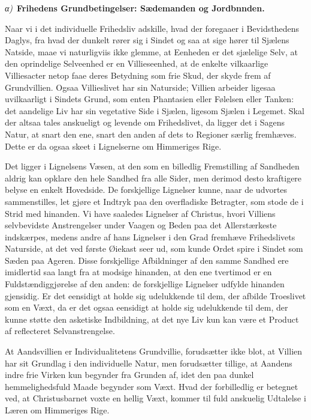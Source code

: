 \documentclass[12pt]{book}
\newcommand{\greekrun}[2]{%
  \medskip\begin{center}{\itshape #1)}\ {\bfseries #2}\end{center}\medskip}
\begin{document}
\greekrun{α}{Frihedens Grundbetingelser: Sædemanden og Jordbnnden.}

Naar vi i det individuelle Frihedsliv adskille, hvad der foregaaer i
Bevidsthedens Daglys, fra hvad der dunkelt rører sig i Sindet og saa
at sige hører til Sjælens Natside, maae vi naturligviis ikke glemme,
at Eenheden er det sjælelige Selv, at den oprindelige Selveenhed er
en Villieseenhed, at de enkelte vilkaarlige Villiesacter netop faae
deres Betydning som frie Skud, der skyde frem af Grundvillien.
Ogsaa Villieslivet har sin Naturside; Villien arbeider ligesaa
uvilkaarligt i Sindets Grund, som enten Phantasien eller Følelsen
eller Tanken: det aandelige Liv har sin vegetative Side i Sjælen,
ligesom Sjælen i Legemet. Skal der altsaa tales anskueligt og
levende om Frihedslivet, da ligger det i Sagens Natur, at snart den
ene, snart den anden af dets to Regioner særlig fremhæves. Dette er
da ogsaa skeet i Lignelserne om Himmeriges Rige.

Det ligger i Lignelsens Væsen, at den som en billedlig Fremstilling
af Sandheden aldrig kan opklare den hele Sandhed fra alle Sider, men
derimod desto kraftigere belyse en enkelt Hovedside. De forskjellige
Lignelser kunne, naar de udvortes sammenstilles, let gjøre et
Indtryk paa den overfladiske Betragter, som stode de i Strid med
hinanden. Vi have saaledes Lignelser af Christus,
hvori Villiens selvbevidste Anstrengelser under Vaagen og Beden paa
det Allerstærkeste indskærpes, medens andre af hans Lignelser i den
Grad fremhæve Frihedslivets Naturside, at det ved første Øiekast
seer ud, som kunde Ordet spire i Sindet som Sæden paa Ageren. Disse
forskjellige Afbildninger af den samme Sandhed ere imidlertid saa
langt fra at modsige hinanden, at den ene tvertimod er en
Fuldstændiggjørelse af den anden: de forskjellige Lignelser udfylde
hinanden gjensidig. Er det eensidigt at holde sig udelukkende til
dem, der afbilde Troeslivet som en Væxt, da er det ogsaa eensidigt
at holde sig udelukkende til dem, der kunne støtte den asketiske
Indbildning, at det nye Liv kun kan være et Product af reflecteret
Selvanstrengelse.

At Aandsvillien er Individualitetens Grundvillie, forudsætter ikke
blot, at Villien har sit Grundlag i den individuelle Natur, men
forudsætter tillige, at Aandens indre frie Virken kun begynder fra
Grunden af, idet den paa dunkel hemmelighedsfuld Maade begynder som
Væxt. Hvad der forbilledlig er betegnet ved, at Christusbarnet voxte
en hellig Væxt, kommer til fuld anskuelig Udtalelse i Læren om
Himmeriges Rige.
\end{document}
